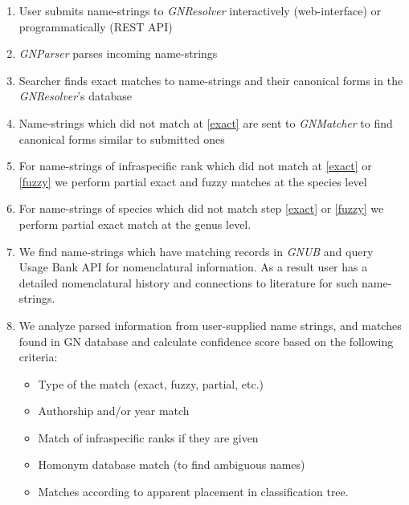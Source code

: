 \documentclass[11pt]{article}
\begin{document}
\begin{enumerate}[label=\textbf{Step \arabic*}]

  \item User submits name-strings to \textit{GNResolver} interactively
    (web-interface) or programmatically (REST API)

  \item \textit{GNParser} parses incoming name-strings

  \item \label{exact} Searcher finds exact matches to name-strings and
    their canonical forms in the \textit{GNResolver}'s database

  \item \label{fuzzy} Name-strings which did not match at \ref{exact} are
    sent to \textit{GNMatcher} to find canonical forms similar to submitted
    ones

  \item For name-strings of infraspecific rank which did not match at
    \ref{exact} or \ref{fuzzy} we perform partial exact and fuzzy matches at
    the species level

  \item For name-strings of species which did not match step \ref{exact} or
    \ref{fuzzy} we perform partial exact match at the genus level.

  \item We find name-strings which have matching records in \textit{GNUB}
    \cite{Pyle2016} and query Usage Bank API for nomenclatural information. As
    a result user has a detailed nomenclatural history and connections to
    literature for such name-strings.

  \item We analyze parsed information from user-supplied name strings, and
    matches found in GN database and calculate confidence score
    based on the following criteria:
    \begin{itemize}
      \item Type of the match (exact, fuzzy, partial, etc.)
      \item Authorship and/or year match
      \item Match of infraspecific ranks if they are given
      \item Homonym database match (to find ambiguous names)
      \item Matches according to apparent placement in classification tree.
    \end{itemize}
\end{enumerate}
\end{document}

